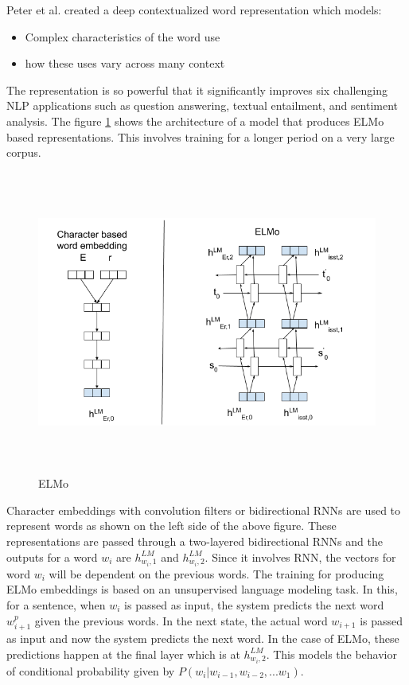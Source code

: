 \documentclass[a4paper, 11pt]{article}
\begin{document}
Peter et al. \parencite{peters2018deep} created a deep contextualized word representation which models:
\begin{itemize}
\item Complex characteristics of the word use
\item how these uses vary across many context                   
\end{itemize}

The representation is so powerful that it significantly improves six challenging NLP applications such as question answering, textual entailment, and sentiment analysis. The figure \ref{fig:ELMO} shows the architecture of a model that produces ELMo based representations. This involves training for a longer period on a very large corpus.

\begin{figure}[H]
    \centering
    \includegraphics[width=\textwidth,height=10cm,keepaspectratio=true]
    {elmo-1.png}
    \caption{
        ELMo
    }
    \label{fig:ELMO}
\end{figure}

Character embeddings with convolution filters or bidirectional RNNs are used to represent words as shown on the left side of the above figure. These representations are passed through a two-layered bidirectional RNNs and the outputs for a word $w_i$ are $h^{LM}_{w_{i},1}$ and $h^{LM}_{w_{i},2}$. Since it involves RNN, the vectors for word $w_i$ will be dependent on the previous words. The training for producing ELMo embeddings is based on an unsupervised language modeling task. In this, for a sentence,  when $w_i$ is passed as input, the system predicts the next word $w^p_{i+1}$ given the previous words. In the next state, the actual word $w_{i+1}$ is passed as input and now the system predicts the next word. In the case of ELMo, these predictions happen at the final layer which is at $h^{LM}_{w_{i},2}$. This models the behavior of conditional probability given by $P(w_i|w_ {i-1},w_{i-2},...w_1)$.
\end{document}
